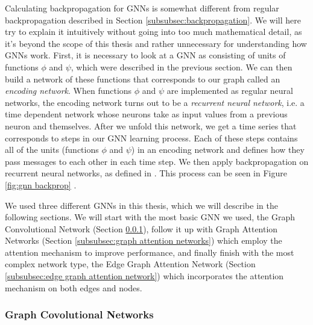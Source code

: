 \documentclass[times, utf8, diplomski, english]{fer_eng}
\begin{document}
Calculating backpropagation for GNNs is somewhat different from regular backpropagation described in Section \ref{subsubsec:backpropagation}. We will here try to explain it intuitively without going into too much mathematical detail, as it's beyond the scope of this thesis and rather unnecessary for understanding how GNNs work. First, it is necessary to look at a GNN as consisting of units of functions $\phi$ and $\psi$, which were described in the previous section. We can then build a network of these functions that corresponds to our graph called an \textit{encoding network}. When functions $\phi$ and $\psi$ are implemented as regular neural networks, the encoding network turns out to be a \textit{recurrent neural network}, i.e. a time dependent network whose neurons take as input values from a previous neuron and themselves. After we unfold this network, we get a time series that corresponds to steps in our GNN learning process. Each of these steps contains all of the units (functions $\phi$ and $\psi$) in an encoding network and defines how they pass messages to each other in each time step. We then apply backpropagation on recurrent neural networks, as defined in \cite{rnn_backprop}. This process can be seen in Figure \ref{fig:gnn backprop} \cite{GNN}.

We used three different GNNs in this thesis, which we will describe in the following sections. We will start with the most basic GNN we used, the Graph Convolutional Network (Section \ref{subsubsec:graph convolutional netwroks}), follow it up with Graph Attention Networks (Section \ref{subsubsec:graph attention networks}) which employ the attention mechanism to improve performance, and finally finish with the most complex network type, the Edge Graph Attention Network (Section \ref{subsubsec:edge graph attention network}) which incorporates the attention mechanism on both edges and nodes.

\subsubsection{Graph Covolutional Networks}
\label{subsubsec:graph convolutional netwroks}
\end{document}
